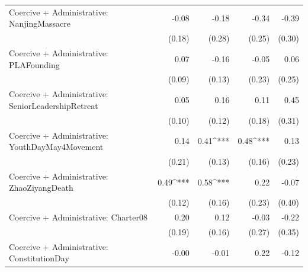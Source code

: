 \begin{table}
\begin{center}
\begin{tabular}{l D{.}{.}{6.5} D{.}{.}{6.5} D{.}{.}{6.5} D{.}{.}{6.5}}
Coercive + Administrative: NanjingMassacre           & -0.08                   & -0.18                   & -0.34                   & -0.39                   \\
                                                     & (0.18)                  & (0.28)                  & (0.25)                  & (0.30)                  \\
Coercive + Administrative: PLAFounding               & 0.07                    & -0.16                   & -0.05                   & 0.06                    \\
                                                     & (0.09)                  & (0.13)                  & (0.23)                  & (0.25)                  \\
Coercive + Administrative: SeniorLeadershipRetreat   & 0.05                    & 0.16                    & 0.11                    & 0.45                    \\
                                                     & (0.10)                  & (0.12)                  & (0.18)                  & (0.31)                  \\
Coercive + Administrative: YouthDayMay4Movement      & 0.14                    & 0.41^{***}              & 0.48^{***}              & 0.13                    \\
                                                     & (0.21)                  & (0.13)                  & (0.16)                  & (0.23)                  \\
Coercive + Administrative: ZhaoZiyangDeath           & 0.49^{***}              & 0.58^{***}              & 0.22                    & -0.07                   \\
                                                     & (0.12)                  & (0.16)                  & (0.23)                  & (0.40)                  \\
Coercive + Administrative: Charter08                 & 0.20                    & 0.12                    & -0.03                   & -0.22                   \\
                                                     & (0.19)                  & (0.16)                  & (0.27)                  & (0.35)                  \\
Coercive + Administrative: ConstitutionDay           & -0.00                   & -0.01                   & 0.22                    & -0.12                   \\

\end{tabular}
\end{center}
\end{table}
